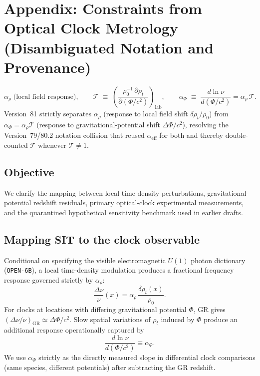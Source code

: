 \section{Appendix: Constraints from Optical Clock Metrology (Disambiguated Notation and Provenance)}
\label{appendix:ClockConstraints}

\[
\alpha_\rho \;\text{(local field response)},
\qquad
\mathcal{T} \;\equiv\; \left(\frac{\rho_0^{-1}\,\partial\rho_t}{\partial(\Phi/c^2)}\right)_{\mathrm{lab}},
\qquad
\alpha_\Phi \;\equiv\; \frac{d\ln\nu}{d(\Phi/c^{2})} = \alpha_\rho\,\mathcal{T}.
\]
Version~81 strictly separates $\alpha_\rho$ (response to local field shift $\delta\rho_t/\rho_0$) from $\alpha_\Phi = \alpha_\rho\mathcal{T}$ (response to gravitational-potential shift $\Delta\Phi/c^2$), resolving the Version~79/80.2 notation collision that reused $\alpha_{\mathrm{eff}}$ for both and thereby double-counted $\mathcal{T}$ whenever $\mathcal{T} \ne 1$.

\subsection{Objective}
We clarify the mapping between local time-density perturbations, gravitational-potential redshift residuals, primary optical-clock experimental measurements, and the quarantined hypothetical sensitivity benchmark used in earlier drafts.

\subsection{Mapping SIT to the clock observable}
Conditional on specifying the visible electromagnetic $U(1)$ photon dictionary (\texttt{OPEN-6B}), a local time-density modulation produces a fractional frequency response governed strictly by $\alpha_\rho$:
\[
\frac{\Delta \nu}{\nu}(x) = \alpha_\rho\,\frac{\delta \rho_t(x)}{\rho_0}.
\]
For clocks at locations with differing gravitational potential \(\Phi\), GR gives \((\Delta \nu/\nu)_{\mathrm{GR}} \simeq \Delta \Phi / c^{2}\). Slow spatial variations of \(\rho_t\) induced by \(\Phi\) produce an additional response operationally captured by
\[
\frac{d\ln \nu}{d(\Phi / c^{2})} \equiv \alpha_\Phi .
\]
We use \(\alpha_\Phi\) strictly as the directly measured slope in differential clock comparisons (same species, different potentials) after subtracting the GR redshift.

